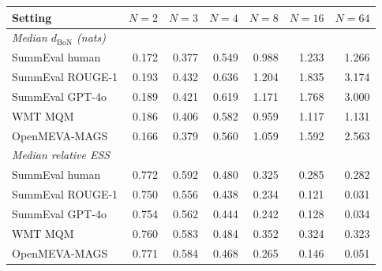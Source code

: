 \begin{tabular}{lrrrrrr}
\toprule
Setting & $N=2$ & $N=3$ & $N=4$ & $N=8$ & $N=16$ & $N=64$ \\
\midrule
\multicolumn{7}{l}{\textit{Median $d_{\mathrm{BoN}}$ (nats)}} \\
SummEval human & 0.172 & 0.377 & 0.549 & 0.988 & 1.233 & 1.266 \\
SummEval ROUGE-1 & 0.193 & 0.432 & 0.636 & 1.204 & 1.835 & 3.174 \\
SummEval GPT-4o & 0.189 & 0.421 & 0.619 & 1.171 & 1.768 & 3.000 \\
WMT MQM & 0.186 & 0.406 & 0.582 & 0.959 & 1.117 & 1.131 \\
OpenMEVA-MAGS & 0.166 & 0.379 & 0.560 & 1.059 & 1.592 & 2.563 \\
\midrule
\multicolumn{7}{l}{\textit{Median relative ESS}} \\
SummEval human & 0.772 & 0.592 & 0.480 & 0.325 & 0.285 & 0.282 \\
SummEval ROUGE-1 & 0.750 & 0.556 & 0.438 & 0.234 & 0.121 & 0.031 \\
SummEval GPT-4o & 0.754 & 0.562 & 0.444 & 0.242 & 0.128 & 0.034 \\
WMT MQM & 0.760 & 0.583 & 0.484 & 0.352 & 0.324 & 0.323 \\
OpenMEVA-MAGS & 0.771 & 0.584 & 0.468 & 0.265 & 0.146 & 0.051 \\
\bottomrule
\end{tabular}
